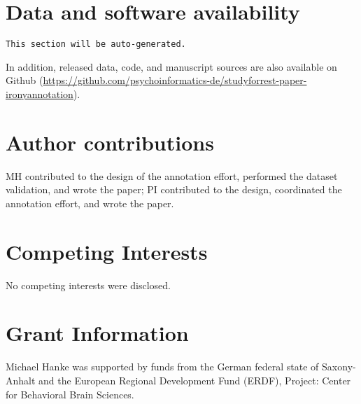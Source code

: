 \documentclass[10pt,a4paper]{article}
\begin{document}
\begin{table*}
  \caption{
    Annotation inter-observer agreement statistics. Number of events and
    categorization agreement are presented for three levels
    of inter-observer agreement on the temporal location and the performing
    movie character. The number of events for any particular event property
    are determined by majority vote across observers, i.e. an event is counted
    when more observers indicate the presence of a property than its absence.
    Exhaustive technical detail on the statistical analysis can be found in the
    \texttt{descriptive\_stats.py} Python script.
  }

  \label{tab:validation}
\end{table*}



\section*{Data and software availability}

\texttt{This section will be auto-generated.}

In addition, released data, code, and manuscript sources are also available on
Github
(\url{https://github.com/psychoinformatics-de/studyforrest-paper-ironyannotation}).


\section*{Author contributions}

MH contributed to the design of the annotation effort, performed the dataset
validation, and wrote the paper; PI contributed to the design, coordinated the
annotation effort, and wrote the paper.

\section*{Competing Interests}
No competing interests were disclosed.

\section*{Grant Information}

Michael Hanke was supported by funds from the German federal state of
Saxony-Anhalt and the European Regional Development Fund (ERDF), Project:
Center for Behavioral Brain Sciences.
\end{document}
